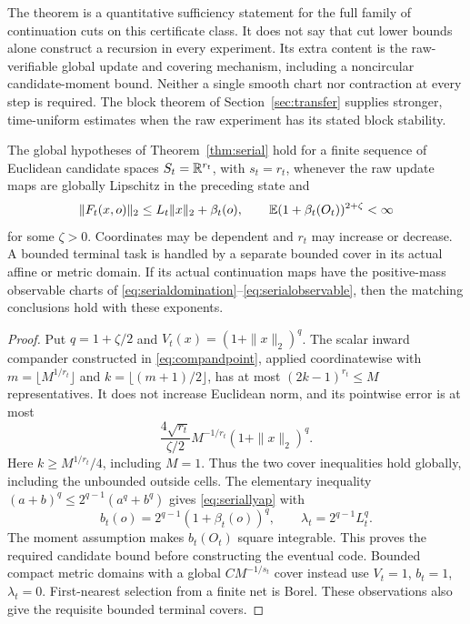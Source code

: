The theorem is a quantitative sufficiency statement for the full family of continuation cuts on this certificate class. It does not say that cut lower bounds alone construct a recursion in every experiment. Its extra content is the raw-verifiable global update and covering mechanism, including a noncircular candidate-moment bound. Neither a single smooth chart nor contraction at every step is required. The block theorem of Section~\ref{sec:transfer} supplies stronger, time-uniform estimates when the raw experiment has its stated block stability.

\begin{lemma}\label{lem:serialcompander}
The global hypotheses of Theorem~\ref{thm:serial} hold for a finite sequence of Euclidean candidate spaces $S_t=\mathbb R^{r_t}$, with $s_t=r_t$, whenever the raw update maps are globally Lipschitz in the preceding state and
\[
 \|F_t(x,o)\|_2\le L_t\|x\|_2+\beta_t(o),\qquad
 \mathbb E(1+\beta_t(O_t))^{2+\zeta}<\infty
\]
for some $\zeta>0$. Coordinates may be dependent and $r_t$ may increase or decrease. A bounded terminal task is handled by a separate bounded cover in its actual affine or metric domain. If its actual continuation maps have the positive-mass observable charts of \eqref{eq:serialdomination}--\eqref{eq:serialobservable}, then the matching conclusions hold with these exponents.
\end{lemma}
\begin{proof}
Put $q=1+\zeta/2$ and $V_t(x)=(1+\|x\|_2)^q$. The scalar inward compander constructed in \eqref{eq:compandpoint}, applied coordinatewise with
$m=\lfloor M^{1/r_t}\rfloor$ and $k=\lfloor(m+1)/2\rfloor$, has at most $(2k-1)^{r_t}\le M$ representatives. It does not increase Euclidean norm, and its pointwise error is at most
\[
 \frac{4\sqrt{r_t}}{\zeta/2}M^{-1/r_t}(1+\|x\|_2)^q.
\]
Here $k\ge M^{1/r_t}/4$, including $M=1$. Thus the two cover inequalities hold globally, including the unbounded outside cells. The elementary inequality $(a+b)^q\le2^{q-1}(a^q+b^q)$ gives \eqref{eq:seriallyap} with
\[
 b_t(o)=2^{q-1}(1+\beta_t(o))^q,\qquad
 \lambda_t=2^{q-1}L_t^q.
\]
The moment assumption makes $b_t(O_t)$ square integrable. This proves the required candidate bound before constructing the eventual code. Bounded compact metric domains with a global $CM^{-1/s_t}$ cover instead use $V_t=1$, $b_t=1$, $\lambda_t=0$. First-nearest selection from a finite net is Borel. These observations also give the requisite bounded terminal covers.
\end{proof}

